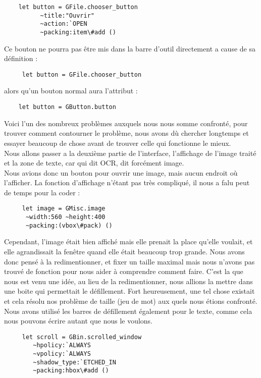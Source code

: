 	 \begin{lstlisting}
	let button = GFile.chooser_button
		  ~title:"Ouvrir"
		  ~action:`OPEN
		  ~packing:item\#add ()
	\end{lstlisting}

	Ce bouton ne pourra pas être mis dans la barre d'outil directement a cause de sa définition :
	\begin{lstlisting}
	 let button = GFile.chooser_button
	\end{lstlisting}

	alors qu'un bouton normal aura l'attribut :
	\begin{lstlisting}
	let button = GButton.button
	\end{lstlisting}

	Voici l'un des nombreux problèmes auxquels nous nous somme confronté, pour trouver comment contourner le problème, nous avons dù chercher longtemps et essayer beaucoup de chose avant de trouver celle qui fonctionne le mieux.\\
	Nous allons passer a la deuxième partie de l'interface, l'affichage de l'image traité et la zone de texte, car qui dit OCR, dit forcément image.\\
	Nous avions donc un bouton pour ouvrir une image, mais aucun endroit où l'afficher. La fonction d'affichage n'étant pas très compliqué, il nous a falu peut de temps pour la coder :\\

	\begin{lstlisting}
	 let image = GMisc.image 
	  ~width:560 ~height:400
	  ~packing:(vbox\#pack) ()
	\end{lstlisting}

	Cependant, l'image était bien affiché mais elle prenait la place qu'elle voulait, et elle agrandissait la fenêtre quand elle était beaucoup trop grande. Nous avons donc pensé à la redimentionner, et fixer un taille maximal mais nous n'avons pas trouvé de fonction pour nous aider à comprendre comment faire. C'est la que nous est venu une idée, au lieu de la redimentionner, nous allions la mettre dans une boite qui permettait le défillement. Fort heureusement, une tel chose existait et cela résolu nos problème de taille (jeu de mot) aux quels nous étions confronté. Nous avons utilisé les barres de défillement également pour le texte, comme cela nous pouvons écrire autant que nous le voulons.

	\begin{lstlisting}
	 let scroll = GBin.scrolled_window
    	~hpolicy:`ALWAYS
    	~vpolicy:`ALWAYS
    	~shadow_type:`ETCHED_IN
    	~packing:hbox\#add ()
	\end{lstlisting}

